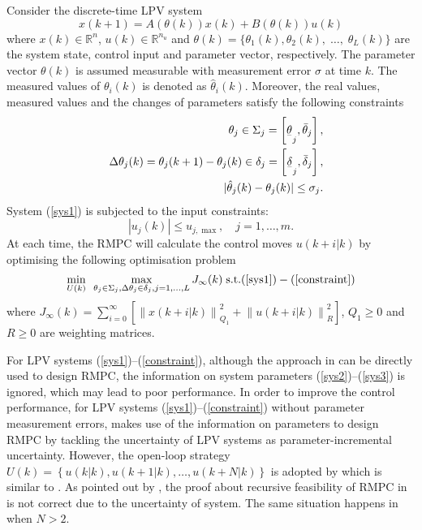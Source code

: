 \documentclass{singlecol-new}
\theoremstyle{TH}{
\newtheorem{lemma}{Lemma}
\newtheorem{theorem}[lemma]{Theorem}
\newtheorem{corrolary}[lemma]{Corrolary}
\newtheorem{conjecture}[lemma]{Conjecture}
\newtheorem{proposition}[lemma]{Proposition}
\newtheorem{claim}[lemma]{Claim}
\newtheorem{stheorem}[lemma]{Wrong Theorem}
\newtheorem{algorithm}{Algorithm}
}
\theoremstyle{THrm}{
\newtheorem{definition}{Definition}[section]
\newtheorem{question}{Question}[section]
\newtheorem{remark}{Remark}
\newtheorem{scheme}{Scheme}
}
\theoremstyle{THhit}{
\newtheorem{case}{Case}[section]
}
\begin{document}
Consider the discrete-time LPV system
\begin{equation}\label{sys1}
x(k + 1) = A(\theta (k))x(k) + B(\theta (k))u(k)
\end{equation}
\noindent where $x(k) \in \mathbb{R}^n$, $u(k) \in \mathbb{R}^{n_u}$
and $\theta(k)=\{\theta_1(k),\theta_2(k),\;\ldots,\;\theta_L(k)\}$
are the system state, control input and parameter vector,
respectively. The parameter vector $\theta (k)$ is assumed
measurable with measurement error $\sigma$ at time $k$. The measured
values of $\theta_i(k)$ is denoted as $\hat{\theta}_i(k)$. Moreover,
the real values, measured values and the changes of parameters
satisfy the following constraints
\begin{eqnarray}\label{sys2}
&&\theta _j \in \Sigma _j  =
\left[{\underset{\raise0.3em\hbox{$\smash{\scriptscriptstyle-}$}}{\theta
} _j },{\bar \theta _j }\right], \\ \label{sys3} &&\Delta \theta _j
(k) = \theta _j (k + 1) - \theta _j (k) \in \delta _j  =
\left[{\underset{\raise0.3em\hbox{$\smash{\scriptscriptstyle-}$}}{\delta}
_j }, {\bar \delta _j}\right],\\\label{error}
&&|\hat{\theta}_j(k)-\theta_j(k)|\leq \sigma_j.
\end{eqnarray}
\noindent System (\ref{sys1}) is subjected to the input constraints:
\begin{equation}\label{constraint}
\left| {u_j (k)} \right| \leq u_{j,\max},\quad j = 1,\ldots,m.
\end{equation}
\noindent At each time, the RMPC will calculate the control moves
$u(k + i|k)$ by optimising the following optimisation problem
\begin{equation}\label{op_p}
\mathop {\min }\limits_{U(k)} {\text{ }}\mathop {\max
}\limits_{\theta _j  \in \Sigma _j ,\Delta \theta _j \in \delta _j
,j = 1,{\ldots},L} J_\infty(k) \; \mbox{s.t.}
(\ref{sys1})-(\ref{constraint})
\end{equation}
\noindent where $J_\infty(k) = \sum\limits_{i = 0}^\infty  {\left[
{\left\| {x(k + i|k)} \right\|_{Q_1 }^2  + \left\| {u(k + i|k)}
\right\|_R^2 } \right]}$, $Q_1\ge 0$ and $R\ge 0$ are weighting
matrices.

\begin{remark}
For LPV systems (\ref{sys1})--(\ref{constraint}), although the
approach in \cite{Kothare} can be directly used to design RMPC, the
information on system parameters (\ref{sys2})--(\ref{sys3}) is
ignored, which may lead to poor performance. In order to improve the
control performance, for LPV systems
(\ref{sys1})--(\ref{constraint}) without parameter measurement
errors, \cite{park2004crl} makes use of the information on
parameters to design RMPC by tackling the uncertainty of LPV systems
as parameter-incremental uncertainty. However, the open-loop
strategy $U(k) = \left\{ {u(k|k),u(k+1|k),\ldots,u(k+N|k)} \right\}$
is adopted by \cite{park2004crl} which is similar to \cite{Wanon}.
As pointed out by \cite{Pluymer}, the proof about recursive
feasibility of RMPC in \cite{Wanon} is not correct due to the
uncertainty of system. The same situation happens in
\cite{park2004crl} when $N>2$.
\end{remark}
\end{document}
